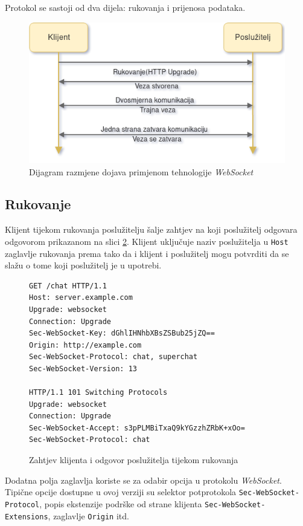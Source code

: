 \documentclass[times, utf8, zavrsni]{fer}
\begin{document}
{Protokol se sastoji od dva dijela: rukovanja  i prijenosa podataka. \citep{rfc6455}

\begin{figure}[htb]
\centering
\includegraphics[width=12cm]{img/websocket.png}
\caption{Dijagram razmjene dojava primjenom tehnologije {\em WebSocket}}
\label{fig:websocket-image}
\end{figure}

\subsection{Rukovanje}
Klijent tijekom rukovanja poslužitelju šalje zahtjev na koji poslužitelj odgovara odgovorom prikazanom na slici \ref{lst:websocket-rukovanje}. Klijent uključuje naziv poslužitelja u {\tt Host} zaglavlje rukovanja prema tako da i klijent i poslužitelj mogu potvrditi da se slažu o tome koji poslužitelj je u upotrebi.

\begin{figure}[htb]
\begin{lstlisting}
GET /chat HTTP/1.1
Host: server.example.com
Upgrade: websocket
Connection: Upgrade
Sec-WebSocket-Key: dGhlIHNhbXBsZSBub25jZQ==
Origin: http://example.com
Sec-WebSocket-Protocol: chat, superchat
Sec-WebSocket-Version: 13

HTTP/1.1 101 Switching Protocols
Upgrade: websocket
Connection: Upgrade
Sec-WebSocket-Accept: s3pPLMBiTxaQ9kYGzzhZRbK+xOo=
Sec-WebSocket-Protocol: chat
\end{lstlisting}
\caption{Zahtjev klijenta i odgovor poslužitelja  tijekom rukovanja}
\label{lst:websocket-rukovanje}
\end{figure}

Dodatna polja zaglavlja koriste se za odabir opcija u protokolu {\em WebSocket}. Tipične opcije dostupne u ovoj verziji su selektor potprotokola {\tt Sec-WebSocket-Protocol}, popis ekstenzije podrške od strane klijenta {\tt Sec-WebSocket-Extensions}, zaglavlje {\tt Origin} itd. 

}
\end{document}

